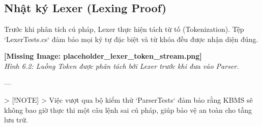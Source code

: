 \subsection{Nhật ký Lexer (Lexing Proof)}

Trước khi phân tích cú pháp, Lexer thực hiện tách từ tố (Tokenization). Tệp `LexerTests.cs` đảm bảo mọi ký tự đặc biệt và từ khóa đều được nhận diện đúng.

\textbf{[Missing Image: placeholder_lexer_token_stream.png]}\\ \textit{Hình 6.2: Luồng Token được phân tách bởi Lexer trước khi đưa vào Parser.}

---

> [!NOTE]
> Việc vượt qua bộ kiểm thử `ParserTests` đảm bảo rằng KBMS sẽ không bao giờ thực thi một câu lệnh sai cú pháp, giúp bảo vệ an toàn cho tầng lưu trữ.

